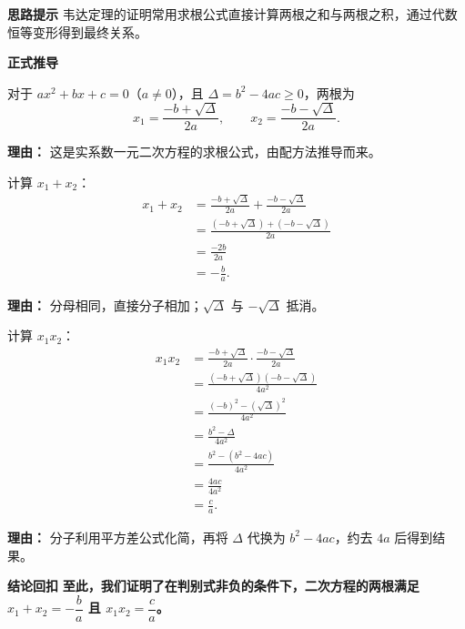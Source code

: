 \begin{proofbox}
	\textbf{\textcolor{CProof}{思路提示}}
	韦达定理的证明常用求根公式直接计算两根之和与两根之积，通过代数恒等变形得到最终关系。

	\medskip
	\textbf{\textcolor{CProof}{正式推导}}
	\begin{description}[style=nextline, leftmargin=2.8em, labelsep=0.5em, itemsep=0.55em]
		\item[\textbf{步骤一（求根公式）：}]
			对于 $ax^2+bx+c=0$（$a\neq0$），且 $\Delta=b^2-4ac\geq 0$，两根为
			\[
				x_1=\frac{-b+\sqrt{\Delta}}{2a},
				\qquad
				x_2=\frac{-b-\sqrt{\Delta}}{2a}.
			\]
			\par\textbf{理由：} 这是实系数一元二次方程的求根公式，由配方法推导而来。
		\item[\textbf{步骤二（求和）：}]
			计算 $x_1+x_2$：
			\[
				\begin{aligned}
					x_1+x_2 &=\frac{-b+\sqrt{\Delta}}{2a}+\frac{-b-\sqrt{\Delta}}{2a} \\ &=\frac{(-b+\sqrt{\Delta})+(-b-\sqrt{\Delta})}{2a} \\ &=\frac{-2b}{2a} \\ &=-\frac{b}{a}.
			\end{aligned}
			\]
			\par\textbf{理由：} 分母相同，直接分子相加；$\sqrt{\Delta}$ 与 $-\sqrt{\Delta}$ 抵消。
		\item[\textbf{步骤三（求积）：}]
			计算 $x_1x_2$：
			\[
				\begin{aligned}
					x_1x_2 &=\frac{-b+\sqrt{\Delta}}{2a}\cdot\frac{-b-\sqrt{\Delta}}{2a} \\ &=\frac{(-b+\sqrt{\Delta})(-b-\sqrt{\Delta})}{4a^2} \\ &=\frac{(-b)^2-(\sqrt{\Delta})^2}{4a^2} \\ &=\frac{b^2-\Delta}{4a^2} \\ &=\frac{b^2-(b^2-4ac)}{4a^2} \\ &=\frac{4ac}{4a^2} \\ &=\frac{c}{a}.
			\end{aligned}
			\]
			\par\textbf{理由：} 分子利用平方差公式化简，再将 $\Delta$ 代换为 $b^2-4ac$，约去 $4a$ 后得到结果。
	\end{description}

	\medskip
	\textbf{\textcolor{CProof}{结论回扣}}
	\textbf{至此，我们证明了在判别式非负的条件下，二次方程的两根满足 $x_1+x_2=-\dfrac{b}{a}$ 且 $x_1x_2=\dfrac{c}{a}$。}
\end{proofbox}

